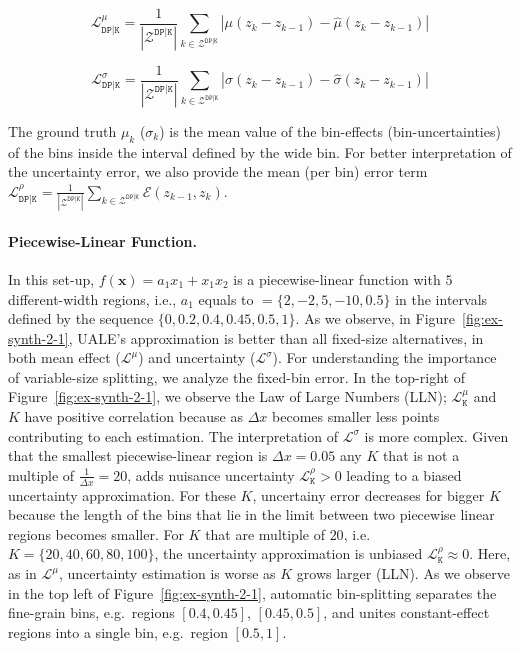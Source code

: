 \documentclass[twoside]{article}
\begin{document}
\begin{equation}
  \label{eq:eval_met_1}
  \mathcal{L}_{\mathtt{DP|K}}^{\mu} = \frac{1}{|\mathcal{Z}^{\mathtt{DP|K}}|} \sum_{k \in
  \mathcal{Z}^{\mathtt{DP|K}}} | \mu(z_k- z_{k-1}) - \hat{\mu}(z_k-
  z_{k-1}) |
\end{equation}


\begin{equation}
  \label{eq:eval_met_2}
  \mathcal{L}_{\mathtt{DP|K}}^{\sigma} = \frac{1}{|\mathcal{Z}^{\mathtt{DP|K}}|} \sum_{k \in
    \mathcal{Z}^{\mathtt{DP|K}}} | \sigma(z_k- z_{k-1}) - \hat{\sigma}(z_k-
  z_{k-1}) |
\end{equation}

The ground truth \(\mu_k\) (\(\sigma_k\)) is the mean value of the
bin-effects (bin-uncertainties) of the bins inside the interval
defined by the wide bin. For better interpretation of the uncertainty
error, we also provide the mean (per bin) error term
\(\mathcal{L}^{\rho}_{\mathtt{DP|K}} =
\frac{1}{|\mathcal{Z}^{\mathtt{DP|K}}|} \sum_{k \in \mathcal{Z}^{\mathtt{DP|K}}} \mathcal{E}(z_{k-1}, z_k) \).

\paragraph{Piecewise-Linear Function.}

In this set-up, \(f(\mathbf{x}) = a_1x_1 + x_1x_2\) is a
piecewise-linear function with \(5\) different-width regions, i.e.,
\(a_1\) equals to \(=\{2, -2, 5, -10, 0.5\}\) in the intervals defined
by the sequence \(\{0, 0.2, 0.4, 0.45, 0.5, 1\}\). As we observe, in
Figure~\ref{fig:ex-synth-2-1}, UALE's approximation is better than all
fixed-size alternatives, in both mean effect (\(\mathcal{L}^{\mu}\))
and uncertainty (\(\mathcal{L}^{\sigma}\)). For understanding the
importance of variable-size splitting, we analyze the fixed-bin
error. In the top-right of Figure~\ref{fig:ex-synth-2-1}, we observe
the Law of Large Numbers (LLN); \(\mathcal{L}^{\mu}_{\mathtt{K}}\) and
\(K\) have positive correlation because as \(\Delta x\) becomes
smaller less points contributing to each estimation. The
interpretation of \(\mathcal{L}^{\sigma}\) is more complex. Given that
the smallest piecewise-linear region is \(\Delta x = 0.05 \) any
\(K\) that is not a multiple of \(\frac{1}{\Delta x} = 20\), adds
nuisance uncertainty \(\mathcal{L}^{\rho}_{\mathtt{K}} > 0\) leading
to a biased uncertainty approximation. For these \(K\), uncertainy
error decreases for bigger \(K\) because the length of the bins that
lie in the limit between two piecewise linear regions becomes
smaller. For \(K\) that are multiple of \(20\), i.e.
\(K=\{20, 40, 60, 80, 100\}\), the uncertainty approximation is
unbiased \(\mathcal{L}^{\rho}_{\mathtt{K}} \approx 0\). Here, as in
\(\mathcal{L}^{\mu}\), uncertainty estimation is worse as \(K\) grows
larger (LLN). As we observe in the top left of
Figure~\ref{fig:ex-synth-2-1}, automatic bin-splitting separates the
fine-grain bins, e.g.~regions \([0.4, 0.45]\), \([0.45, 0.5]\), and
unites constant-effect regions into a single bin, e.g.~region
\([0.5, 1]\).
\end{document}
